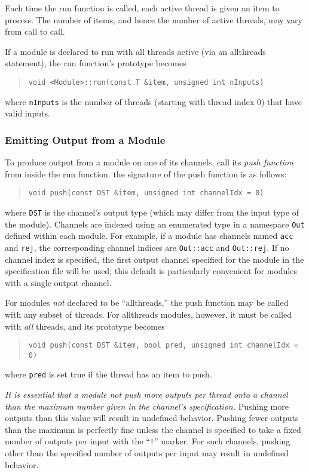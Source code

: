 \documentclass[11pt]{article}
\begin{document}
Each time the run function is called, each active thread is given an
item to process.  The number of items, and hence the number of active
threads, may vary from call to call.

If a module is declared to run with all threads active (via an
allthreads statement), the run function's prototype becomes
\begin{quote}
\texttt{void <Module>::run(const T \&item, unsigned int nInputs)}
\end{quote}
where \texttt{nInputs} is the number of threads (starting with thread
index 0) that have valid inputs.

\subsubsection{Emitting Output from a Module}

To produce output from a module on one of its channels, call its
\textit{push function} from inside the run function.  the signature
of the push function is as follows:
\begin{quote}
\texttt{void push(const DST \&item, unsigned int channelIdx = 0)}
\end{quote}
where \texttt{DST} is the channel's output type (which may differ from
the input type of the module). Channels are indexed using an
enumerated type in a namespace \texttt{Out} defined within each
module.  For example, if a module has channels named \texttt{acc} and
\texttt{rej}, the corresponding channel indices are \texttt{Out::acc}
and \texttt{Out::rej}.  If no channel index is specified, the first
output channel specified for the module in the specification file will
be used; this default is particularly convenient for modules with a
single output channel.

For modules \emph{not} declared to be ``allthreads,'' the push function
may be called with any subset of threads.  For allthreads modules,
however, it must be called with \emph{all} threads, and its prototype
becomes
\begin{quote}
\texttt{void push(const DST \&item, bool pred, unsigned int channelIdx = 0)}
\end{quote}
where \texttt{pred} is set true if the thread has an item to push.

\emph{It is essential that a module not push more outputs per thread
  onto a channel than the maximum number given in the channel's
  specification.}  Pushing more outputs than this value will result in
undefined behavior.  Pushing fewer outputs than the maximum is
perfectly fine unless the channel is specified to take a fixed number
of outputs per input with the ``\texttt{!}'' marker. For such
channels, pushing other than the specified number of outputs per input
may result in undefined behavior.
\end{document}
